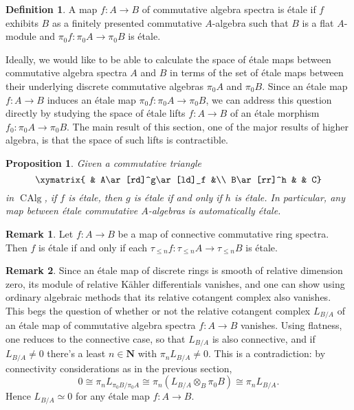 \documentclass{article}
\newtheorem{proposition}{Proposition}[subsection]
\theoremstyle{definition}
\newtheorem{definition}{Definition}[subsection]
\newtheorem{remark}{Remark}[subsection]
\newcommand{\NN}{\mathbf{N}}
\DeclareMathOperator{\CAlg}{CAlg}
\begin{document}
\begin{definition}
A map $f:A\to B$ of commutative algebra spectra is {\'etale}
if $f$ exhibits $B$ as a finitely presented commutative $A$-algebra such that $B$ is a flat $A$-module and $\pi_0 f:\pi_0 A\to\pi_0 B$ is \'etale.
\end{definition}

Ideally, we would like to be able to calculate the space of \'etale maps between commutative algebra spectra $A$ and $B$ in terms of the set of \'etale maps between their underlying discrete commutative algebras $\pi_0 A$ and $\pi_0 B$.
Since an \'etale map $f:A\to B$ induces an \'etale map $\pi_0 f:\pi_0 A\to\pi_0 B$, we can address this question directly by studying the space of \'etale lifts $f:A\to B$ of an \'etale morphism $f_0:\pi_0 A\to\pi_0 B$.
The main result of this section, one of the major results of higher algebra, is that the space of such lifts is contractible.

\begin{proposition}{\em \cite[Remark 7.5.1.7]{HA}}\label{prop:mbemie}
Given a commutative triangle
\[
\xymatrix{
& A\ar[rd]^g\ar[ld]_f &\\
B\ar[rr]^h & & C}
\]
 in $\CAlg$, if $f$ is \'etale, then $g$ is \'etale if and only if $h$ is \'etale.
 In particular, any map between \'etale commutative $A$-algebras is automatically \'etale.
\end{proposition}

\begin{remark} Let $f : A\to B$ be a map of connective commutative ring spectra. Then $f$ is \'etale if and only if each  $\tau_{\leq n}f:\tau_{\leq n} A\to\tau_{\leq n} B$ is \'etale.
\end{remark}

\begin{remark}
Since an \'etale map of discrete rings is smooth of relative dimension zero, its module of relative K\"ahler differentials vanishes, and one can show using ordinary algebraic methods that its relative cotangent complex also vanishes.
This begs the question of whether or not the relative cotangent complex $L_{B/A}$ of an \'etale map of commutative algebra spectra $f:A\to B$ vanishes.
Using flatness, one reduces to the connective case, so that $L_{B/A}$ is also connective, and if $L_{B/A}\neq 0$  there's a least $n\in\NN$ with $\pi_n L_{B/A}\neq 0$.
This is a contradiction: by connectivity considerations as in the previous section, 
\[
0\cong\pi_n L_{\pi_0 B/\pi_0 A}\cong\pi_n(L_{B/A}\otimes_B\pi_0 B)\cong\pi_n L_{B/A}.
\]
Hence $L_{B/A}\simeq 0$ for any \'etale map $f:A\to B$.
\end{remark}
\end{document}

